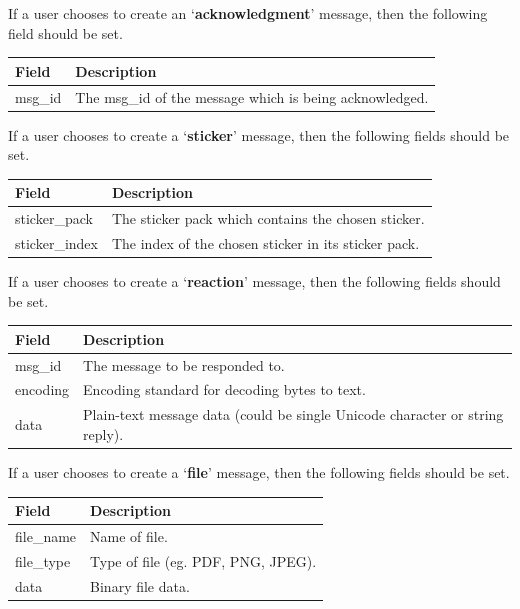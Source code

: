 \documentclass{article}
\begin{document}
If a user chooses to create an `\textbf{acknowledgment}' message, then the following field should be set.
\begin{table}[H]
\centering
\begin{tabular}{|p{2.5cm}|p{8.5cm}|}
\hline
\rowcolor{tblgrey} 
Field           & Description                                               \\ \hline
msg\_id         & The msg\_id of the message which is being acknowledged.   \\ \hline
\end{tabular}
\end{table}

If a user chooses to create a `\textbf{sticker}' message, then the following fields should be set.
\begin{table}[H]
\centering
\begin{tabular}{|p{2.5cm}|p{8.5cm}|}
\hline
\rowcolor{tblgrey} 
Field           & Description                                               \\ \hline
sticker\_pack   & The sticker pack which contains the chosen sticker.       \\ \hline
sticker\_index  & The index of the chosen sticker in its sticker pack.      \\ \hline
\end{tabular}
\end{table}

If a user chooses to create a `\textbf{reaction}' message, then the following fields should be set.
\begin{table}[H]
\centering
\begin{tabular}{|p{2.5cm}|p{8.5cm}|}
\hline
\rowcolor{tblgrey} 
Field           & Description                                               \\ \hline
msg\_id         & The message to be responded to.                           \\ \hline
encoding        & Encoding standard for decoding bytes to text.      \\ \hline
data            & Plain-text message data (could be single Unicode character or string reply).      \\ \hline
\end{tabular}
\end{table}

If a user chooses to create a `\textbf{file}' message, then the following fields should be set.
\begin{table}[H]
\centering
\begin{tabular}{|p{2.5cm}|p{8.5cm}|}
\hline
\rowcolor{tblgrey} 
Field           & Description                                               \\ \hline
file\_name      & Name of file.                                             \\ \hline
file\_type      & Type of file (eg. PDF, PNG, JPEG).                        \\ \hline
data            & Binary file data.                                         \\ \hline
\end{tabular}
\end{table}
\end{document}
